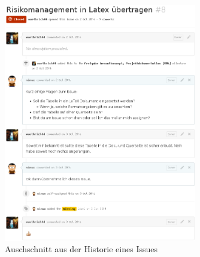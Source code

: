 \begin{figure}[h!]
	\centering
	\includegraphics[width=0.75\textwidth]{../../fig/github/issue_comment.png}
	\caption{Auschschnitt aus der Historie eines Issues}
	\label{fig:comment}
\end{figure}
